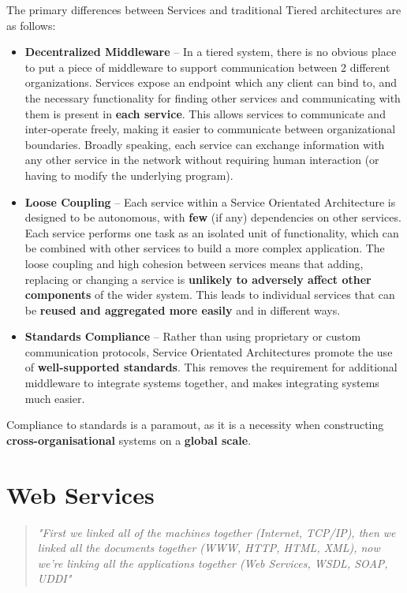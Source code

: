 \documentclass{article}
\begin{document}
The primary differences between Services and traditional Tiered architectures are as follows:
\begin{itemize}
    \item \textbf{Decentralized Middleware} -- In a tiered system, there is no obvious place to put a piece of middleware to support communication between 2 different organizations. Services expose an endpoint which any client can bind to, and the necessary functionality for finding other services and communicating with them is present in \textbf{each service}. This allows services to communicate and inter-operate freely, making it easier to communicate between organizational boundaries. Broadly speaking, each service can exchange information with any other service in the network without requiring human interaction (or having to modify the underlying program).
    \item \textbf{Loose Coupling} -- Each service within a Service Orientated Architecture is designed to be autonomous, with \textbf{few} (if any) dependencies on other services. Each service performs one task as an isolated unit of functionality, which can be combined with other services to build a more complex application. The loose coupling and high cohesion between services means that adding, replacing or changing a service is \textbf{unlikely to adversely affect other components} of the wider system. This leads to individual services that can be \textbf{reused and aggregated more easily} and in different ways.
    \item \textbf{Standards Compliance} -- Rather than using proprietary or custom communication protocols, Service Orientated Architectures promote the use of \textbf{well-supported standards}. This removes the requirement for additional middleware to integrate systems together, and makes integrating systems much easier.
\end{itemize}

Compliance to standards is a paramout, as it is a necessity when constructing \textbf{cross-organisational} systems on a \textbf{global scale}.

\section{Web Services}

\begin{quote}
	\textit{"First we linked all of the machines together (Internet, TCP/IP), then we linked all the documents together (WWW, HTTP, HTML, XML), now we're linking all the applications together (Web Services, WSDL, SOAP, UDDI"}
\end{quote}
\end{document}
